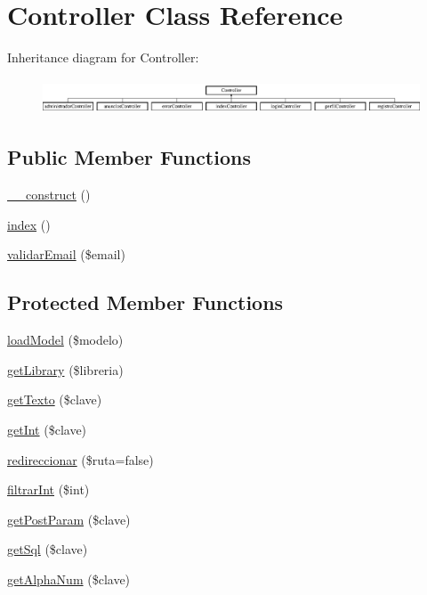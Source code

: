 \hypertarget{class_controller}{}\section{Controller Class Reference}
\label{class_controller}
Inheritance diagram for Controller\+:\begin{figure}[H]
\begin{center}
\leavevmode
\includegraphics[height=1.052632cm]{class_controller}
\end{center}
\end{figure}
\subsection*{Public Member Functions}
\begin{DoxyCompactItemize}
\item 
\hyperlink{class_controller_a095c5d389db211932136b53f25f39685}{\+\_\+\+\_\+construct} ()
\item 
\hyperlink{class_controller_a149eb92716c1084a935e04a8d95f7347}{index} ()
\item 
\hyperlink{class_controller_a0e73d4ad814de3b9b7a94912a6256df6}{validar\+Email} (\$email)
\end{DoxyCompactItemize}
\subsection*{Protected Member Functions}
\begin{DoxyCompactItemize}
\item 
\hyperlink{class_controller_a9d9ece147e27cb131258533ac46bafb5}{load\+Model} (\$modelo)
\item 
\hyperlink{class_controller_ab348b1246953f83d4187a81d3ffdfc77}{get\+Library} (\$libreria)
\item 
\hyperlink{class_controller_acc88e87d06b405b93c8902d235d0d7e8}{get\+Texto} (\$clave)
\item 
\hyperlink{class_controller_a780ed4f9160a4cc854982e7bf1858b4f}{get\+Int} (\$clave)
\item 
\hyperlink{class_controller_a72977e74ea6e97ae4213d712e1aea074}{redireccionar} (\$ruta=false)
\item 
\hyperlink{class_controller_aee35e0ca77db3a4bea153b1a658cf863}{filtrar\+Int} (\$int)
\item 
\hyperlink{class_controller_a173f37c14e9e692e758c3ebbc5bfe1b7}{get\+Post\+Param} (\$clave)
\item 
\hyperlink{class_controller_a5e0cce69ed9e182725b74b0edc596f5a}{get\+Sql} (\$clave)
\item 
\hyperlink{class_controller_ab8c1bcc729777552605eeacda114cff3}{get\+Alpha\+Num} (\$clave)
\end{DoxyCompactItemize}
